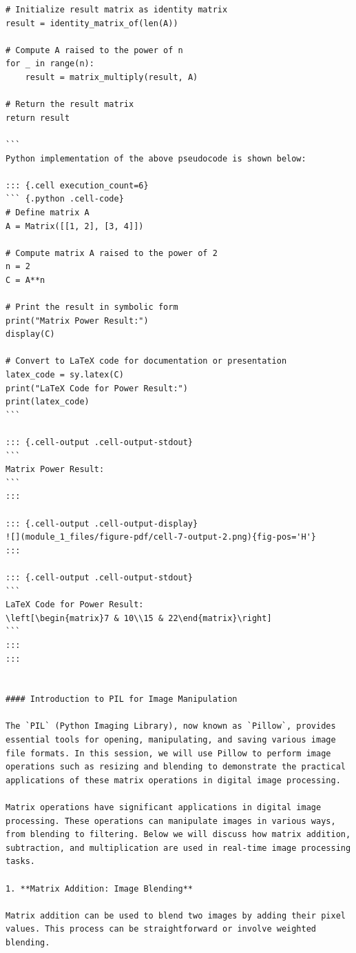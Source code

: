 \documentclass[
  letterpaper,
  DIV=11,
  numbers=noendperiod]{scrreprt}
\theoremstyle{plain}
\theoremstyle{definition}
\theoremstyle{remark}
\begin{document}
\begin{verbatim}
# Initialize result matrix as identity matrix
result = identity_matrix_of(len(A))

# Compute A raised to the power of n
for _ in range(n):
    result = matrix_multiply(result, A)

# Return the result matrix
return result

```
Python implementation of the above pseudocode is shown below:

::: {.cell execution_count=6}
``` {.python .cell-code}
# Define matrix A
A = Matrix([[1, 2], [3, 4]])

# Compute matrix A raised to the power of 2
n = 2
C = A**n

# Print the result in symbolic form
print("Matrix Power Result:")
display(C)

# Convert to LaTeX code for documentation or presentation
latex_code = sy.latex(C)
print("LaTeX Code for Power Result:")
print(latex_code)
```

::: {.cell-output .cell-output-stdout}
```
Matrix Power Result:
```
:::

::: {.cell-output .cell-output-display}
![](module_1_files/figure-pdf/cell-7-output-2.png){fig-pos='H'}
:::

::: {.cell-output .cell-output-stdout}
```
LaTeX Code for Power Result:
\left[\begin{matrix}7 & 10\\15 & 22\end{matrix}\right]
```
:::
:::


#### Introduction to PIL for Image Manipulation

The `PIL` (Python Imaging Library), now known as `Pillow`, provides essential tools for opening, manipulating, and saving various image file formats. In this session, we will use Pillow to perform image operations such as resizing and blending to demonstrate the practical applications of these matrix operations in digital image processing.

Matrix operations have significant applications in digital image processing. These operations can manipulate images in various ways, from blending to filtering. Below we will discuss how matrix addition, subtraction, and multiplication are used in real-time image processing tasks.

1. **Matrix Addition: Image Blending**

Matrix addition can be used to blend two images by adding their pixel values. This process can be straightforward or involve weighted blending.


\end{verbatim}
\end{document}

